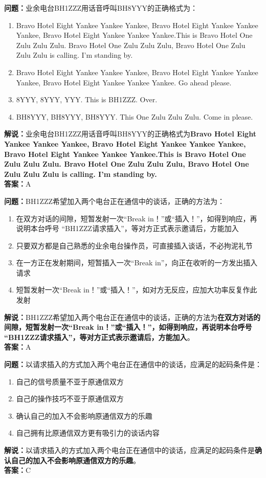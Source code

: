 \documentclass{ctexbook}
\begin{document}
\bigskip


\noindent\textbf{问题：}业余电台BH1ZZZ用话音呼叫BH8YYY的正确格式为：
\begin{enumerate}[label=\Alph*), leftmargin=3em]
	\item Bravo Hotel Eight Yankee Yankee Yankee, Bravo Hotel Eight Yankee Yankee Yankee, Bravo Hotel Eight Yankee Yankee Yankee.This is Bravo Hotel One Zulu Zulu Zulu. Bravo Hotel One Zulu Zulu Zulu, Bravo Hotel One Zulu Zulu Zulu is calling. I’m standing by.
	\item Bravo Hotel Eight Yankee Yankee Yankee, Bravo Hotel Eight Yankee Yankee Yankee, Bravo Hotel Eight Yankee Yankee Yankee. Go ahead please.
	\item 8YYY, 8YYY, YYY. This is BH1ZZZ. Over.
	\item BH8YYY, BH8YYY, BH8YYY. This One Zulu Zulu Zulu. Come in please.
\end{enumerate}
\noindent\textbf{解说：}业余电台BH1ZZZ用话音呼叫BH8YYY的正确格式为\textbf{Bravo Hotel Eight Yankee Yankee Yankee, Bravo Hotel Eight Yankee Yankee Yankee, Bravo Hotel Eight Yankee Yankee Yankee.This is Bravo Hotel One Zulu Zulu Zulu. Bravo Hotel One Zulu Zulu Zulu, Bravo Hotel One Zulu Zulu Zulu is calling. I’m standing by.}\\\noindent\textbf{答案：}A


\bigskip


\noindent\textbf{问题：}BH1ZZZ希望加入两个电台正在通信中的谈话，正确的方法为：
\begin{enumerate}[label=\Alph*), leftmargin=3em]
	\item 在双方对话的间隙，短暂发射一次“Break in！”或“插入！”，如得到响应，再说明本台呼号 “BH1ZZZ请求插入”，等对方正式表示邀请后，方能加入
	\item 只要双方都是自己熟悉的业余电台操作员，可直接插入谈话，不必拘泥礼节
	\item 在一方正在发射期间，短暂插入一次“Break in”，向正在收听的一方发出插入请求
	\item 短暂发射一次“Break in！”或“插入！”，如对方无反应，应加大功率反复作此发射
\end{enumerate}
\noindent\textbf{解说：}BH1ZZZ希望加入两个电台正在通信中的谈话，正确的方法为\textbf{在双方对话的间隙，短暂发射一次“Break in！”或“插入！”，如得到响应，再说明本台呼号 “BH1ZZZ请求插入”，等对方正式表示邀请后，方能加入}。\\\noindent\textbf{答案：}A


\bigskip


\noindent\textbf{问题：}以请求插入的方式加入两个电台正在通信中的谈话，应满足的起码条件是：
\begin{enumerate}[label=\Alph*), leftmargin=3em]
	\item 自己的信号质量不亚于原通信双方
	\item 自己的操作技巧不亚于原通信双方
	\item 确认自己的加入不会影响原通信双方的乐趣
	\item 自己拥有比原通信双方更有吸引力的谈话内容
\end{enumerate}
\noindent\textbf{解说：}以请求插入的方式加入两个电台正在通信中的谈话，应满足的起码条件是\textbf{确认自己的加入不会影响原通信双方的乐趣}。\\\noindent\textbf{答案：}C
\end{document}
